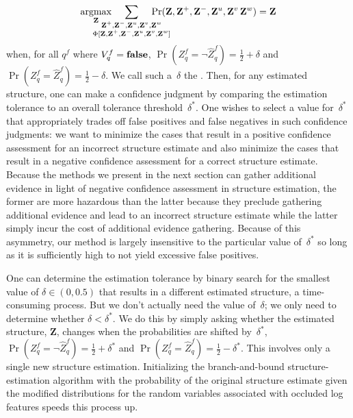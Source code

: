 \par\vspace*{-1.25ex}
\begin{equation*}
  \argmax_{\mathbf{Z}}\hspace{-5ex}
  \sum_{\substack{\mathbf{Z}^{+},\mathbf{Z}^{-},\mathbf{Z}^u,\mathbf{Z}^v,\mathbf{Z}^w\\
      \Phi[\mathbf{Z},\mathbf{Z}^{+},\mathbf{Z}^{-},\mathbf{Z}^u,\mathbf{Z}^v,\mathbf{Z}^w]}}\hspace{-5ex}
  \Pr(\mathbf{Z},\mathbf{Z}^{+},\mathbf{Z}^{-},\mathbf{Z}^u,\mathbf{Z}^v\,\mathbf{Z}^w)=\mathbf{Z}
  \vspace*{-0.5ex}
\end{equation*}
%
when, for all $q^f$ where $V^f_q=\mathbf{false}$,
%
\begin{math}
    \Pr(Z^f_q=\neg\hat{Z}^f_q)=\frac{1}{2}+\delta
\end{math}
and
\begin{math}
    \Pr(Z^f_q=\hat{Z}^f_q)=\frac{1}{2}-\delta.
\end{math}
%
We call such a~$\delta$ the .
%
Then, for any estimated structure, one can make a confidence judgment by
comparing the estimation tolerance to an overall tolerance threshold~$\delta^*$.
%
One wishes to select a value for~$\delta^*$ that appropriately trades off false
positives and false negatives in such confidence judgments: we want to
minimize the cases that result in a positive confidence assessment for an
incorrect structure estimate and also minimize the cases that result in a
negative confidence assessment for a correct structure estimate.
%
Because the methods we present in the next section can gather additional
evidence in light of negative confidence assessment in structure estimation,
the former are more hazardous than the latter because they preclude gathering
additional evidence and lead to an incorrect structure estimate while the
latter simply incur the cost of additional evidence gathering.
%
Because of this asymmetry, our method is largely insensitive to the particular
value of~$\delta^*$ so long as it is sufficiently high to not yield excessive
false positives.

One can determine the estimation tolerance by binary search for the smallest
value of $\delta\in(0,0.5)$ that results in a different estimated structure, a
time-consuming process.
%
But we don't actually need the value of~$\delta$; we only need to determine
whether $\delta<\delta^*$.
%
We do this by simply asking whether the estimated structure, $\mathbf{Z}$,
changes when the probabilities are shifted by~$\delta^*$, \ie\
%
\begin{math}
    \Pr(Z^f_q=\neg\hat{Z}^f_q)=\frac{1}{2}+\delta^{*}
\end{math}
and
\begin{math}
    \Pr(Z^f_q=\hat{Z}^f_q)=\frac{1}{2}-\delta^{*}
\end{math}.
%
This involves only a single new structure estimation.
%
Initializing the branch-and-bound structure-estimation algorithm with the
probability of the original structure estimate given the modified distributions
for the random variables associated with occluded log features speeds this
process up.

